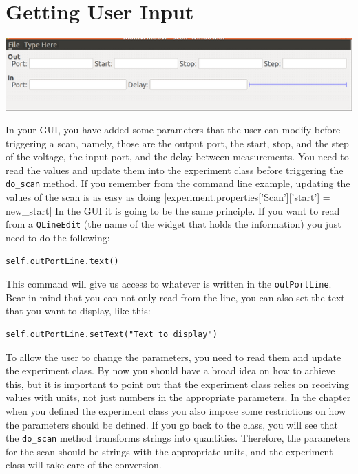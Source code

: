 \section{Getting User Input}\label{getting-userinput}

\begin{center}
\includegraphics[width=.6\textwidth]{images/scan_window.png}
\end{center}

In your {GUI}, you have added some parameters that the user can modify
before triggering a scan, namely, those are the output port, the start,
stop, and the step of the voltage, the input port, and the delay between
measurements. You need to read the values and update them into the
experiment class before triggering the \texttt{do_scan} method. If you
remember from the command line example, updating the values of the scan
is as easy as doing
|experiment.properties['Scan']['start'] = new_start|
In the {GUI} it is going to be the same principle. If you want to read
from a \texttt{QLineEdit} (the name of the widget that holds the
information) you just need to do the following:

\begin{verbatim}
self.outPortLine.text()
\end{verbatim}

This command will give us access to whatever is written in the
\texttt{outPortLine}. Bear in mind that you can not only read from the
line, you can also set the text that you want to display, like this:

\begin{verbatim}
self.outPortLine.setText("Text to display")
\end{verbatim}


To allow the user to change the parameters, you need to read them and
update the experiment class. By now you should have a broad idea on how
to achieve this, but it is important to point out that the experiment
class relies on receiving values with units, not just numbers in the
appropriate parameters. In the chapter when you defined the experiment
class you also impose some restrictions on how the parameters should be
defined. If you go back to the class, you will see that the
\texttt{do_scan} method transforms strings into quantities. Therefore,
the parameters for the scan should be strings with the appropriate
units, and the experiment class will take care of the conversion.

